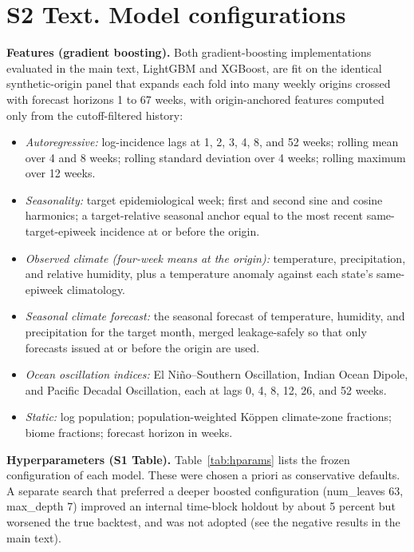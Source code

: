 \documentclass[11pt]{article}
\begin{document}
\section*{S2 Text. Model configurations}
\textbf{Features (gradient boosting).} Both gradient-boosting implementations evaluated in the main
text, LightGBM and
XGBoost, are fit on the identical synthetic-origin panel that
expands each fold into many weekly origins crossed with forecast horizons 1 to 67 weeks, with
origin-anchored features computed only from the cutoff-filtered history:
\begin{itemize}
\item \emph{Autoregressive:} log-incidence lags at 1, 2, 3, 4, 8, and 52 weeks; rolling mean over 4
and 8 weeks; rolling standard deviation over 4 weeks; rolling maximum over 12 weeks.
\item \emph{Seasonality:} target epidemiological week; first and second sine and cosine harmonics; a
target-relative seasonal anchor equal to the most recent same-target-epiweek incidence at or before
the origin.
\item \emph{Observed climate (four-week means at the origin):} temperature, precipitation, and
relative humidity, plus a temperature anomaly against each state's same-epiweek climatology.
\item \emph{Seasonal climate forecast:} the seasonal forecast of temperature, humidity, and
precipitation for the target month, merged leakage-safely so that only forecasts issued at or before
the origin are used.
\item \emph{Ocean oscillation indices:} El Ni\~no--Southern Oscillation, Indian Ocean Dipole, and
Pacific Decadal Oscillation, each at lags 0, 4, 8, 12, 26, and 52 weeks.
\item \emph{Static:} log population; population-weighted K\"oppen climate-zone fractions; biome
fractions; forecast horizon in weeks.
\end{itemize}

\noindent\textbf{Hyperparameters (S1 Table).} Table~\ref{tab:hparams} lists the frozen configuration
of each model. These were chosen a priori as conservative defaults. A separate search that preferred a
deeper boosted configuration (num\_leaves 63, max\_depth 7) improved an internal time-block holdout by
about 5 percent but worsened the true backtest, and was not adopted (see the negative results in the
main text).
\end{document}
